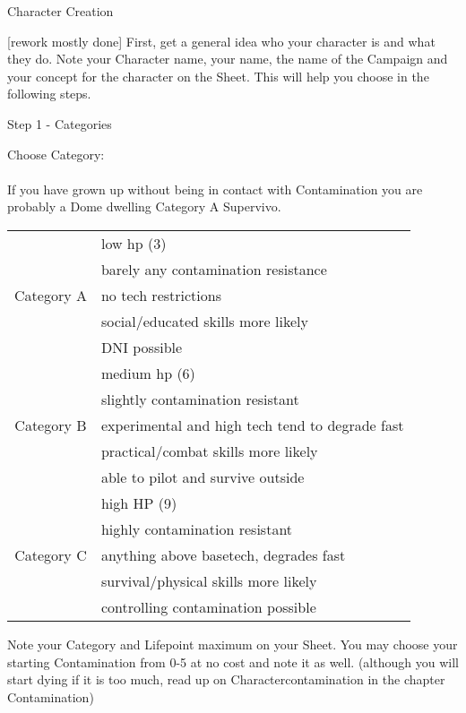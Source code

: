 \documentclass{article}
\newcommand{\headline}[1]{\begin{center}\Large #1 \normalsize \end{center}}
\newcommand{\subhline}[1]{\begin{center}\large #1 \normalsize \end{center}}
\begin{document}
    \headline{Character Creation}
    [rework mostly done]
    First, get a general idea who your character is and what they do. Note your Character name, your name, the name of the
    Campaign and your concept for the character on the Sheet. This will help you choose in the following steps.

    \subhline{Step 1 - Categories}

    Choose Category:\\\\
    If you have grown up without being in contact with Contamination you are probably a Dome dwelling Category A Supervivo. \\
    \begin{tabular}{c|l}
        & low hp (3)\\
        & barely any contamination resistance\\
        Category A     & no tech restrictions\\
        & social/educated skills more likely\\
        & DNI possible\\\hline
        & medium hp (6)\\
        & slightly contamination resistant\\
        Category B    & experimental and high tech tend to degrade fast\\
        & practical/combat skills more likely\\
        & able to pilot and survive outside\\\hline
        & high HP (9) \\
        & highly contamination resistant \\
        Category C & anything above basetech, degrades fast\\
        & survival/physical skills more likely\\
        & controlling contamination possible
    \end{tabular}\newline


    \par

    Note your Category and Lifepoint maximum on your Sheet. You may choose your starting Contamination from 0-5 at no cost and note
    it as well. (although you will start dying if it is too much, read up on Charactercontamination in the chapter Contamination)\\
\end{document}
